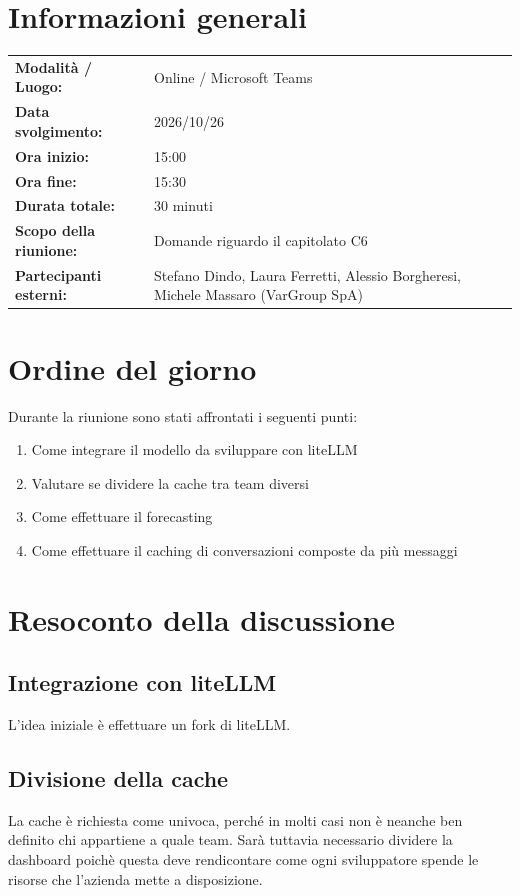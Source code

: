 \documentclass[a4paper, 11pt]{article}
\begin{document}
\newpage
\tableofcontents
\newpage


\section{Informazioni generali}
\begin{tabularx}{\textwidth}{l X}
    \textbf{Modalità / Luogo:} & Online / Microsoft Teams \\
    \textbf{Data svolgimento:} & 2026/10/26 \\
    \textbf{Ora inizio:} & 15:00 \\
    \textbf{Ora fine:} & 15:30 \\
    \textbf{Durata totale:} & 30 minuti \\
    \textbf{Scopo della riunione:} & Domande riguardo il capitolato C6 \\
    \textbf{Partecipanti esterni:} & Stefano Dindo, Laura Ferretti, Alessio Borgheresi, Michele Massaro (VarGroup SpA)
\end{tabularx}

\newpage


\section{Ordine del giorno}
Durante la riunione sono stati affrontati i seguenti punti:
\begin{enumerate}
    \item Come integrare il modello da sviluppare con liteLLM
    \item Valutare se dividere la cache tra team diversi
    \item Come effettuare il forecasting
    \item Come effettuare il caching di conversazioni composte da più messaggi

\end{enumerate}

\newpage


\section{Resoconto della discussione}

\subsection{Integrazione con liteLLM}
L'idea iniziale è effettuare un fork di liteLLM.
\subsection{Divisione della cache}
La cache è richiesta come univoca, perché in molti casi non è neanche ben definito chi appartiene a quale team.
Sarà tuttavia necessario dividere la dashboard poichè questa deve rendicontare come ogni sviluppatore spende le risorse che l'azienda mette a disposizione.
\end{document}
